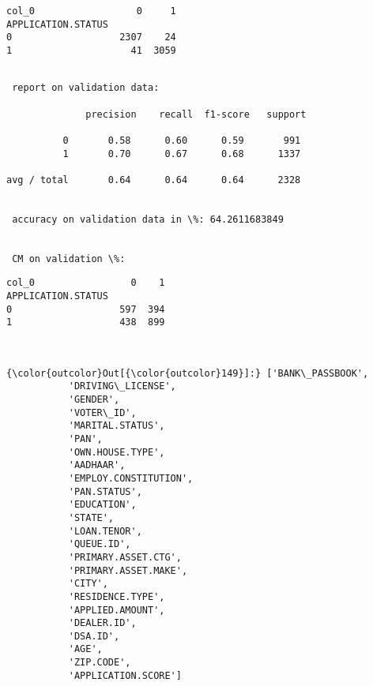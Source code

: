 \documentclass[11pt]{article}
\begin{document}
    
    \begin{verbatim}
col_0                  0     1
APPLICATION.STATUS            
0                   2307    24
1                     41  3059
    \end{verbatim}

    
    \begin{Verbatim}[commandchars=\\\{\}]

 report on validation data: 

              precision    recall  f1-score   support

          0       0.58      0.60      0.59       991
          1       0.70      0.67      0.68      1337

avg / total       0.64      0.64      0.64      2328


 accuracy on validation data in \%: 64.2611683849


 CM on validation \%: 

    \end{Verbatim}

    
    \begin{verbatim}
col_0                 0    1
APPLICATION.STATUS          
0                   597  394
1                   438  899
    \end{verbatim}

    
    \begin{center}
    \end{center}
    { \hspace*{\fill} \\}
    
\begin{Verbatim}[commandchars=\\\{\}]
{\color{outcolor}Out[{\color{outcolor}149}]:} ['BANK\_PASSBOOK',
           'DRIVING\_LICENSE',
           'GENDER',
           'VOTER\_ID',
           'MARITAL.STATUS',
           'PAN',
           'OWN.HOUSE.TYPE',
           'AADHAAR',
           'EMPLOY.CONSTITUTION',
           'PAN.STATUS',
           'EDUCATION',
           'STATE',
           'LOAN.TENOR',
           'QUEUE.ID',
           'PRIMARY.ASSET.CTG',
           'PRIMARY.ASSET.MAKE',
           'CITY',
           'RESIDENCE.TYPE',
           'APPLIED.AMOUNT',
           'DEALER.ID',
           'DSA.ID',
           'AGE',
           'ZIP.CODE',
           'APPLICATION.SCORE']
\end{Verbatim}
            
\end{document}

